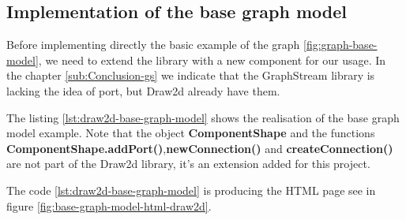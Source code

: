 \subsection{Implementation of the base graph model}
\label{sub:Implementation of the base graph model}

Before implementing directly the basic example of the graph \ref{fig:graph-base-model},
we need to extend the library with a new component for our usage.
In the chapter \ref{sub:Conclusion-gs} we indicate that the GraphStream library is lacking the idea of port, but Draw2d already have them.

The listing \ref{lst:draw2d-base-graph-model} shows the realisation of the base
graph model example. Note that the object \textbf{ComponentShape} and the
functions \textbf{ComponentShape.addPort()},\textbf{newConnection()} and
\textbf{createConnection()} are not part of the Draw2d library, it's an
extension added for this project.

The code \ref{lst:draw2d-base-graph-model} is producing the HTML page see in
figure \ref{fig:base-graph-model-html-draw2d}.

